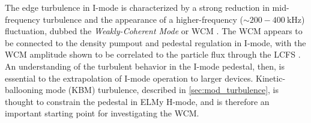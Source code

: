 The edge turbulence in I-mode is characterized by a strong reduction in mid-frequency turbulence and the appearance of a higher-frequency ($\sim 200 - \SI{400}{\kilo\hertz}$) fluctuation, dubbed the \emph{Weakly-Coherent Mode} or WCM \cite{Whyte2010,Hubbard2011,Dominguez2012,Cziegler2011,Cziegler2013,White2011}.  The WCM appears to be connected to the density pumpout and pedestal regulation in I-mode, with the WCM amplitude shown to be correlated to the particle flux through the LCFS \cite{Dominguez2012}.  An understanding of the turbulent behavior in the I-mode pedestal, then, is essential to the extrapolation of I-mode operation to larger devices.  Kinetic-ballooning mode (KBM) turbulence, described in \cref{sec:mod_turbulence}, is thought to constrain the pedestal in ELMy H-mode, and is therefore an important starting point for investigating the WCM.

\begin{figure}[t]
 \pushtooutside
\end{figure}


